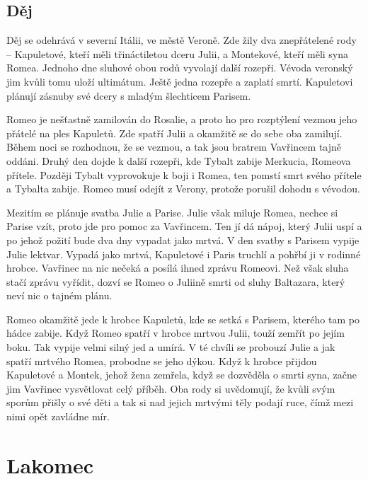 \documentclass[12pt, a4paper]{article}
\begin{document}
\subsection*{\color{subsectioncolor}Děj}
Děj se odehrává v severní Itálii, ve městě Veroně. Zde žily dva znepřátelené rody -- Kapuletové, kteří měli třináctiletou dceru Julii, a Montekové, kteří měli syna Romea. Jednoho dne sluhové obou rodů vyvolají další rozepři. Vévoda veronský jim kvůli tomu uloží ultimátum. Ještě jedna rozepře a zaplatí smrtí. Kapuletovi plánují zásnuby své dcery s mladým šlechticem Parisem.

Romeo je nešťastně zamilován do Rosalie, a proto ho pro rozptýlení vezmou jeho přátelé na ples Kapuletů. Zde spatří Julii a okamžitě se do sebe oba zamilují. Během noci se rozhodnou, že se vezmou, a tak jsou bratrem Vavřincem tajně oddáni. Druhý den dojde k další rozepři, kde Tybalt zabije Merkucia, Romeova přítele. Později Tybalt vyprovokuje k boji i Romea, ten pomstí smrt svého přítele a Tybalta zabije. Romeo musí odejít z Verony, protože porušil dohodu s vévodou.

Mezitím se plánuje svatba Julie a Parise. Julie však miluje Romea, nechce si Parise vzít, proto jde pro pomoc za Vavřincem. Ten jí dá nápoj, který Julii uspí a po jehož požití bude dva dny vypadat jako mrtvá. V den svatby s Parisem vypije Julie lektvar. Vypadá jako mrtvá, Kapuletové i Paris truchlí a pohřbí ji v rodinné hrobce. Vavřinec na nic nečeká a posílá ihned zprávu Romeovi. Než však sluha stačí zprávu vyřídit, dozví se Romeo o Juliině smrti od sluhy Baltazara, který neví nic o tajném plánu.

Romeo okamžitě jede k hrobce Kapuletů, kde se setká s Parisem, kterého tam po hádce zabije. Když Romeo spatří v hrobce mrtvou Julii, touží zemřít po jejím boku. Tak vypije velmi silný jed a umírá. V té chvíli se probouzí Julie a jak spatří mrtvého Romea, probodne se jeho dýkou. Když k hrobce přijdou Kapuletové a Montek, jehož žena zemřela, když se dozvěděla o smrti syna, začne jim Vavřinec vysvětlovat celý příběh. Oba rody si uvědomují, že kvůli svým sporům přišly o své děti a tak si nad jejich mrtvými těly podají ruce, čímž mezi nimi opět zavládne mír.

\newpage


\section{Lakomec}
\end{document}
